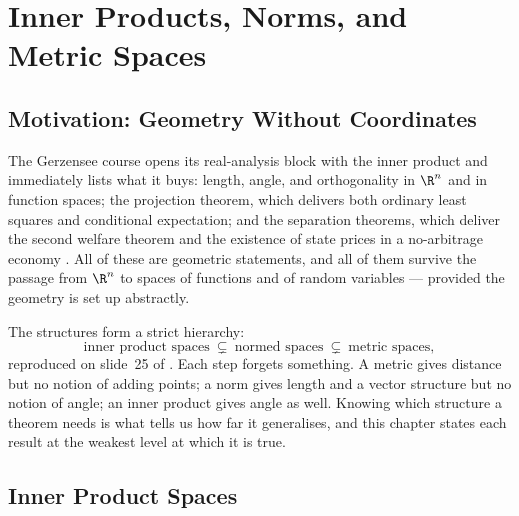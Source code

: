 
\chapter{Inner Products, Norms, and Metric Spaces}\label{ch:metric}

\section{Motivation: Geometry Without Coordinates}\label{sec:met-motivation}

The Gerzensee course opens its real-analysis block with the inner product and
immediately lists what it buys: length, angle, and orthogonality in $\R^n$ and in
function spaces; the projection theorem, which delivers both ordinary least
squares and conditional expectation; and the separation theorems, which deliver
the second welfare theorem and the existence of state prices in a no-arbitrage
economy \autocite[slide 3]{fukuda2026analysis}. All of these are geometric
statements, and all of them survive the passage from $\R^n$ to spaces of
functions and of random variables --- provided the geometry is set up
abstractly.

The structures form a strict hierarchy:
\[
	\text{inner product spaces}\ \subsetneq\
	\text{normed spaces}\ \subsetneq\
	\text{metric spaces},
\]
reproduced on slide~25 of \autocite{fukuda2026analysis}. Each step forgets
something. A metric gives distance but no notion of adding points; a norm gives
length and a vector structure but no notion of angle; an inner product gives
angle as well. Knowing which structure a theorem needs is what tells us how far
it generalises, and this chapter states each result at the weakest level at which
it is true.

\section{Inner Product Spaces}\label{sec:met-ip}

